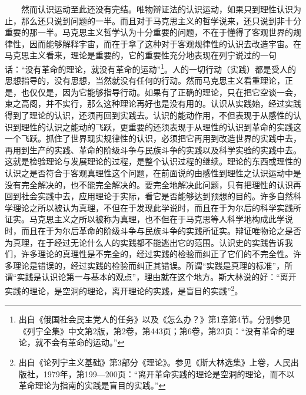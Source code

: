 \documentclass[cn,11pt,chinese]{elegantbook}
\begin{document}
　　然而认识运动至此还没有完结。唯物辩证法的认识运动，如果只到理性认识为止，那么还只说到问题的一半。而且对于马克思主义的哲学说来，还只说到非十分重要的那一半。马克思主义哲学认为十分重要的问题，不在于懂得了客观世界的规律性，因而能够解释宇宙，而在于拿了这种对于客观规律性的认识去改造宇宙。在马克思主义看来，理论是重要的，它的重要性充分地表现在列宁说过的一句话：“没有革命的理论，就没有革命的运动”\footnote[23]{ 出自《俄国社会民主党人的任务》以及《怎么办？》第1章第4节。分别参见《列宁全集》中文第2版，第2卷，第443页；第6卷，第23页：“没有革命的理论，就不会有革命的运动。”}。人的一切行动（实践）都是受人的思想指导的，没有思想，当然就没有任何的行动。然而马克思主义看重理论，正是，也仅仅是，因为它能够指导行动。如果有了正确的理论，只在把它空谈一会，束之高阁，并不实行，那么这种理论再好也是没有用的。认识从实践始，经过实践得到了理论的认识，还须再回到实践去。认识的能动作用，不但表现于从感性的认识到理性的认识之能动的飞跃，更重要的还须表现于从理性的认识到革命的实践这一个飞跃。抓住了世界现实规律性的认识，必须把它再用到改造世界的实践中去，再用到生产的实践、革命的阶级斗争与民族斗争的实践以及科学实验的实践中去。这就是检验理论与发展理论的过程，是整个认识过程的继续。理论的东西或理性的认识之是否符合于客观真理性这个问题，在前面说的由感性到理性之认识运动中是没有完全解决的，也不能完全解决的。要完全地解决此问题，只有把理性的认识再回到社会实践中去，应用理论于实际，看它是否能够达到预想的目的。许多自然科学理论之所以被认为真理，不但在于发现此学说时，而且在于为尔后的科学实践所证实。马克思主义之所以被称为真理，也不但在于马克思等人科学地构成此学说时，而且在于为尔后革命的阶级斗争与民族斗争的实践所证实。辩证唯物论之是否为真理，在于经过无论什么人的实践都不能逃出它的范围。认识史的实践告诉我们，许多理论的真理性是不完全的，经过实践的检验而纠正了它们的不完全性。许多理论是错误的，经过实践的检验而纠正其错误。所谓“实践是真理的标准”，所谓“实践是认识论第一与基本的观点”，理由就在这个地方。斯大林说的好：“离开实践的理论，是空洞的理论，离开理论的实践，是盲目的实践”\footnote[24]{ 出自《论列宁主义基础》第3部分《理论》。参见《斯大林选集》上卷，人民出版社，1979年，第199—200页：“离开革命实践的理论是空洞的理论，而不以革命理论为指南的实践是盲目的实践。”}。\\
\end{document}
